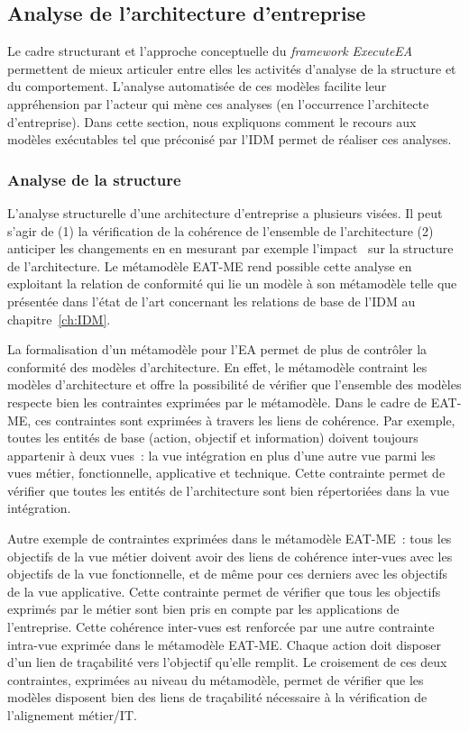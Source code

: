     \subsection{Analyse de l'architecture d'entreprise}
    \label{sec:analyse}
Le cadre structurant et l'approche conceptuelle du \emph{framework ExecuteEA} permettent de mieux articuler entre elles les activités d'analyse de la structure et du comportement. L'analyse automatisée de ces modèles facilite leur appréhension par l'acteur qui
mène ces analyses (en l'occurrence l'architecte d'entreprise). Dans cette section, nous expliquons comment le recours aux modèles exécutables tel que préconisé par l'IDM permet de réaliser ces analyses.

    \subsubsection{Analyse de la structure}


L'analyse structurelle d'une architecture d'entreprise a plusieurs visées. Il peut s'agir de (1) la
vérification de la cohérence de l'ensemble de l'architecture (2) anticiper les changements en
en mesurant par exemple l'impact~\cite{de2005change} sur la structure de l'architecture.
Le métamodèle EAT-ME rend possible cette analyse en exploitant la relation de conformité qui lie un modèle à son
métamodèle telle que présentée dans l'état de l'art concernant les relations de base de l'IDM
au chapitre~\ref{ch:IDM}. 

La formalisation d'un métamodèle pour l'EA permet de plus de
contrôler la conformité des modèles d'architecture. En effet, le métamodèle
contraint les modèles d'architecture et offre la possibilité de vérifier
que l'ensemble des modèles respecte bien les contraintes exprimées par le
métamodèle.
Dans le cadre de EAT-ME, ces contraintes sont exprimées à travers les liens
de cohérence. Par exemple, toutes les entités de base (action, objectif et information)
doivent toujours appartenir à deux vues~: la vue intégration en plus d'une autre vue
parmi les vues métier, fonctionnelle, applicative et technique. Cette contrainte permet de vérifier
que toutes les entités de l'architecture sont bien répertoriées dans la vue intégration.

Autre exemple de contraintes exprimées dans le métamodèle EAT-ME~: tous les objectifs de la vue métier
doivent avoir des liens de cohérence inter-vues avec les objectifs de la vue fonctionnelle, et de même pour ces derniers
avec les objectifs de la vue applicative. Cette contrainte permet de vérifier que tous les objectifs exprimés par le métier sont bien pris
en compte par les applications de l'entreprise. Cette cohérence inter-vues est renforcée par une autre contrainte intra-vue
exprimée dans le métamodèle EAT-ME. Chaque action doit disposer d'un lien de traçabilité vers l'objectif qu'elle remplit.
Le croisement  de ces deux contraintes, exprimées au niveau du métamodèle, permet de vérifier que les modèles disposent
bien des liens de traçabilité nécessaire à la vérification de l'alignement métier/IT.

